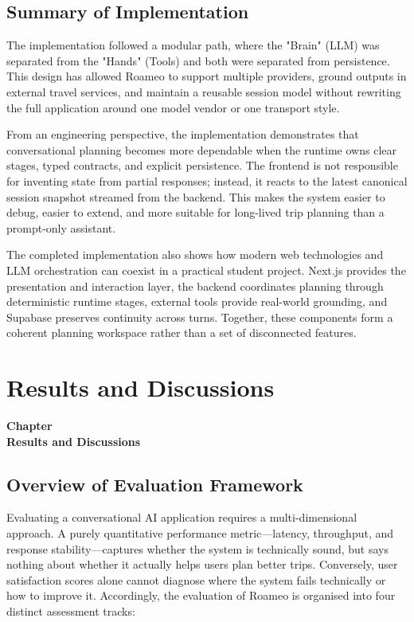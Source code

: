 \documentclass[12pt,a4paper]{report}
\newcommand{\chaptercontentheading}[1]{%
  \thispagestyle{mainstyle}%
  \begin{center}
    {\Large\bfseries Chapter~\thechapter}\\[0.35cm]
    {\Large\bfseries #1}
  \end{center}
  \vspace{0.9cm}
}
\begin{document}
\section{Summary of Implementation}
The implementation followed a modular path, where the "Brain" (LLM) was separated from the "Hands" (Tools) and both were separated from persistence. This design has allowed Roameo to support multiple providers, ground outputs in external travel services, and maintain a reusable session model without rewriting the full application around one model vendor or one transport style.

From an engineering perspective, the implementation demonstrates that conversational planning becomes more dependable when the runtime owns clear stages, typed contracts, and explicit persistence. The frontend is not responsible for inventing state from partial responses; instead, it reacts to the latest canonical session snapshot streamed from the backend. This makes the system easier to debug, easier to extend, and more suitable for long-lived trip planning than a prompt-only assistant.

The completed implementation also shows how modern web technologies and LLM orchestration can coexist in a practical student project. Next.js provides the presentation and interaction layer, the backend coordinates planning through deterministic runtime stages, external tools provide real-world grounding, and Supabase preserves continuity across turns. Together, these components form a coherent planning workspace rather than a set of disconnected features.

\chapter{Results and Discussions}
\chaptercontentheading{Results and Discussions}

\section{Overview of Evaluation Framework}

Evaluating a conversational AI application requires a multi-dimensional approach. A purely quantitative performance metric---latency, throughput, and response stability---captures whether the system is technically sound, but says nothing about whether it actually helps users plan better trips. Conversely, user satisfaction scores alone cannot diagnose where the system fails technically or how to improve it. Accordingly, the evaluation of Roameo is organised into four distinct assessment tracks:
\end{document}
